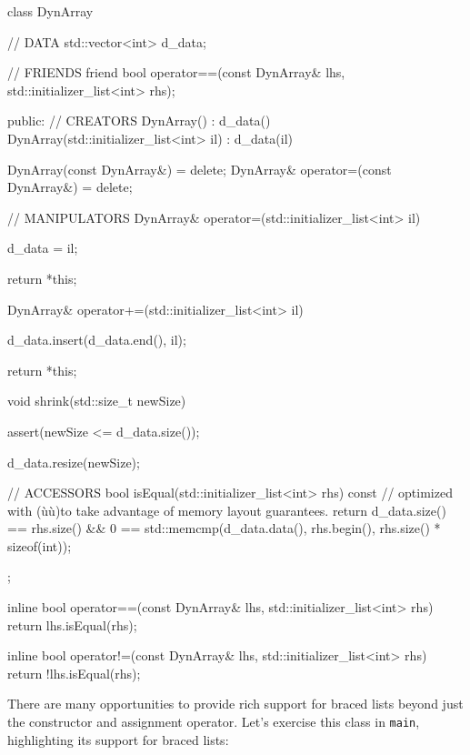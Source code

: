 \begin{emcppslisting}
class DynArray
{
    // DATA
    std::vector<int> d_data;

    // FRIENDS
    friend bool operator==(const DynArray&            lhs,
                           std::initializer_list<int> rhs);

  public:
    // CREATORS
    DynArray() : d_data() {}
    DynArray(std::initializer_list<int> il) : d_data(il) {}

    DynArray(const DynArray&) = delete;
    DynArray& operator=(const DynArray&) = delete;

    // MANIPULATORS
    DynArray& operator=(std::initializer_list<int> il)
    {
        d_data = il;

        return *this;
    }

    DynArray& operator+=(std::initializer_list<int> il)
    {
        d_data.insert(d_data.end(), il);

        return *this;
    }

    void shrink(std::size_t newSize)
    {
        assert(newSize <= d_data.size());

        d_data.resize(newSize);
    }

    // ACCESSORS
    bool isEqual(std::initializer_list<int> rhs) const
    {
        // optimized with (ù{}ù)to take advantage of memory layout guarantees.
        return d_data.size() == rhs.size()
            && 0 == std::memcmp(d_data.data(),
                                rhs.begin(),
                                rhs.size() * sizeof(int));
    }
};

inline
bool operator==(const DynArray& lhs, std::initializer_list<int> rhs)
{
    return lhs.isEqual(rhs);
}

inline
bool operator!=(const DynArray& lhs, std::initializer_list<int> rhs)
{
    return !lhs.isEqual(rhs);
}
\end{emcppslisting}
    

\noindent There are many opportunities to provide rich support for braced lists
beyond just the constructor and assignment operator. Let's exercise this
class in \lstinline!main!, highlighting its support for braced lists:

